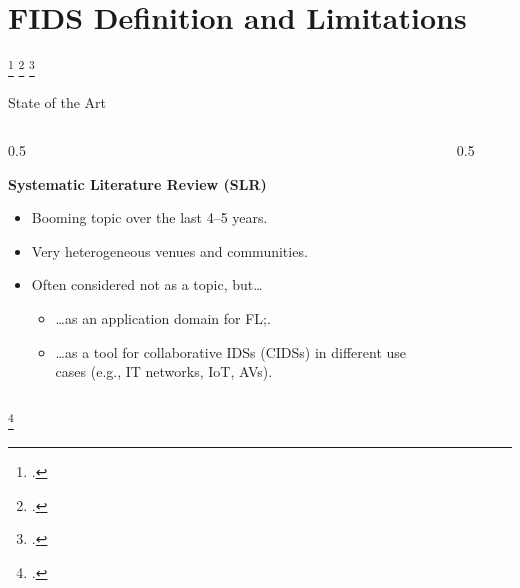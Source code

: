 

\section{FIDS Definition and Limitations}

\begin{frame}
  \sectionpage

  \footcite*{lavaur_tnsm_2022}
  \footcite*{lavaur_cesar_2022}
  \footcite*{lavaur_icdcs_demo_2024}
\end{frame}


\begin{frame}{State of the Art}

  \begin{columns}
    \begin{column}{0.5\textwidth}

      \textbf{Systematic Literature Review (SLR)}~\autocite{lavaur_tnsm_2022}
      \begin{itemize}
        \item Booming topic over the last 4--5 years.
        \item<2-> Very heterogeneous venues and communities.
        \item<3-> Often considered not as a topic, but\dots
        \begin{itemize}
          \item \dots{}as an application domain for FL;.
          \item \dots{}as a tool for collaborative IDSs (CIDSs) in different use cases (e.g., IT networks, IoT, AVs).
        \end{itemize}
      \end{itemize}
      
    \end{column}

    \begin{column}{0.5\textwidth}
      \begin{figure}
        \centering
      \end{figure}
    \end{column}
      
  \end{columns}

  \footcite*{lavaur_tnsm_2022}

\end{frame}

